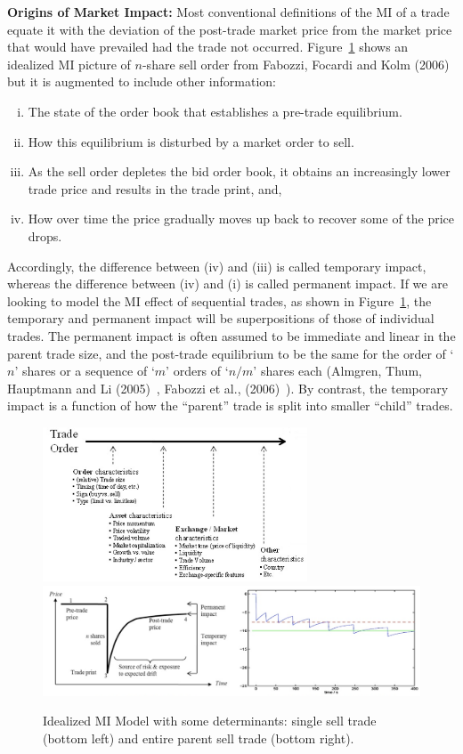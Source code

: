 \noindent \textbf{Origins of Market Impact:} Most conventional definitions of the MI of a trade equate it with the deviation of the post-trade market price from the market price that would have prevailed had the trade not occurred. Figure~\ref{fig:marketimpt} shows an idealized MI picture of $n$-share sell order from Fabozzi, Focardi and Kolm (2006)~\cite{ffk} but it is augmented to include other information:
	\begin{enumerate}[(i)]
	\item The state of the order book that establishes a pre-trade equilibrium.
	\item How this equilibrium is disturbed by a market order to sell.
	\item As the sell order depletes the bid order book, it obtains an increasingly lower trade price and results in the trade print, and, 
	\item How over time the price gradually moves up back to recover some of the price drops.
	\end{enumerate}
Accordingly, the difference between (iv) and (iii) is called temporary impact, whereas the difference between (iv) and (i) is called permanent impact. If we are looking to model the MI effect of sequential trades, as shown in Figure~\ref{fig:marketimpt}, the temporary and permanent impact will be superpositions of those of individual trades. The permanent impact is often assumed to be immediate and linear in the parent trade size, and the post-trade equilibrium to be the same for the order of `$n$' shares or a sequence of `$m$' orders of `$n/m$' shares each (Almgren, Thum, Hauptmann and Li (2005)~\cite{athl}, Fabozzi et al., (2006)~\cite{ffk}). By contrast, the temporary impact is a function of how the ``parent'' trade is split into smaller ``child'' trades.

	\begin{figure}[!ht]
	\centering
	\includegraphics[width=0.7\textwidth]{chapters/chapter_mi_models/figures/fig2b.png}
	\includegraphics[width=\textwidth]{chapters/chapter_mi_models/figures/fig1ab2.png}
	\caption{Idealized MI Model with some determinants: single sell trade (bottom left) and entire parent sell trade (bottom right). \label{fig:marketimpt}}
	\end{figure}


